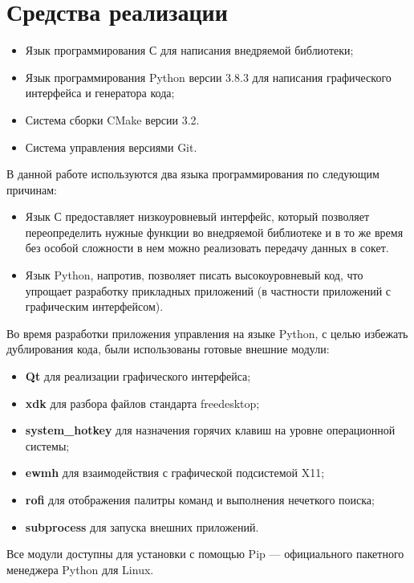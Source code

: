 \section{Средства реализации}

\begin{itemize}
	\item Язык программирования С для написания внедряемой библиотеки;
	\item Язык программирования Python версии 3.8.3 для написания графического
		интерфейса и генератора кода;
	\item Система сборки CMake версии 3.2.
	\item Система управления версиями Git.
\end{itemize}

В данной работе используются два языка программирования по следующим причинам:

\begin{itemize}
	\item Язык С предоставляет низкоуровневый интерфейс, который позволяет
		переопределить нужные функции во внедряемой библиотеке и в то же время
		без особой сложности в нем можно реализовать передачу данных в сокет.
	\item Язык Python, напротив, позволяет писать высокоуровневый код, что
		упрощает разработку прикладных приложений (в частности приложений с
		графическим интерфейсом).
\end{itemize}

Во время разработки приложения управления на языке Python, с целью избежать
дублирования кода, были использованы готовые внешние модули:

\begin{itemize}
	\item \textbf{Qt} для реализации графического интерфейса;
	\item \textbf{xdk} для разбора файлов стандарта freedesktop;
	\item \textbf{system\_hotkey} для назначения горячих клавиш на уровне
		операционной системы;
	\item \textbf{ewmh} для взаимодействия с графической подсистемой X11;
	\item \textbf{rofi} для отображения палитры команд и выполнения нечеткого
		поиска;
	\item \textbf{subprocess} для запуска внешних приложений.
\end{itemize}

Все модули доступны для установки с помощью Pip — официального пакетного
менеджера Python для Linux.

